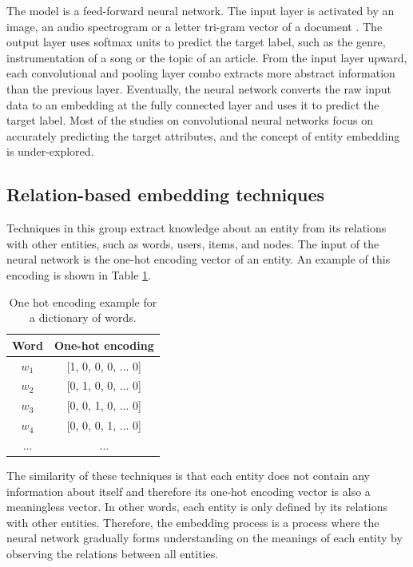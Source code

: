 \documentclass[conference]{IEEEtran}
\begin{document}
The model is a feed-forward neural network.
The input layer is activated by
an image,
an audio spectrogram \cite{van2013deep} or
a letter tri-gram vector of a document \cite{elkahky2015multi}.
The output layer uses softmax units to predict the target label,
such as the genre, instrumentation of a song or the topic of an article.
From the input layer upward,
each convolutional and pooling layer combo extracts more abstract information
than the previous layer.
Eventually, the neural network converts the raw input data to an embedding
at the fully connected layer and uses it to predict the target label.
Most of the studies on convolutional neural networks focus on accurately
predicting the target attributes,
and the concept of entity embedding is under-explored.

\subsection{Relation-based embedding techniques}
Techniques in this group extract knowledge about an entity from its relations 
with other entities, such as words, users, items, and nodes.
The input of the neural network is the one-hot encoding vector of an entity.
An example of this encoding is shown in Table \ref{tab:one-hot}.
\begin{table}[!ht]
	\centering
	\caption{One hot encoding example for a dictionary of words.}
	\begin{tabular}{cc} \hline \rowcolor{blue!30}
		Word & One-hot encoding \\ \hline
		$ w_1 $ & [1, 0, 0, 0, ... 0]       \\ \hline
		$ w_2 $ & [0, 1, 0, 0, ... 0]       \\ \hline
		$ w_3 $ & [0, 0, 1, 0, ... 0]       \\ \hline
		$ w_4 $ & [0, 0, 0, 1, ... 0]       \\ \hline
		... & ...       \\ \hline
	\end{tabular}
	\label{tab:one-hot}
\end{table}
The similarity of these techniques is that each entity does not contain any
information about itself and therefore its one-hot encoding vector is also
a meaningless vector.
In other words, each entity is only defined by its relations with other entities.
Therefore, the embedding process is a process where the neural network gradually
forms understanding on the meanings of each entity by observing the relations
between all entities.
\end{document}

